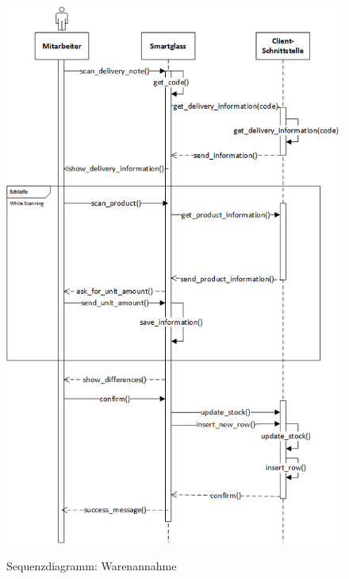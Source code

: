 \begin{figure}[H]
	\centering
	{\includegraphics[scale=0.75]{Bilder/Abbildungen/SMAR_warenannahme_Sequenzdiagramm.png}}
	\caption{Sequenzdiagramm: Warenannahme}
	\label{fig:sequenz_warenannnahme}
\end{figure}

